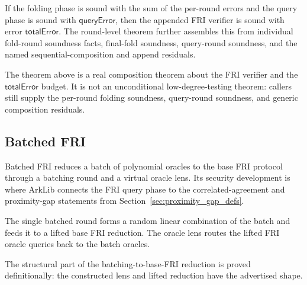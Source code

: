 \begin{theorem}\label{thm:fri_soundness_total_error}
    If the folding phase is sound with the sum of the per-round errors and the query phase is
    sound with $\mathsf{queryError}$, then the appended FRI verifier is sound with error
    $\mathsf{totalError}$.  The round-level theorem further assembles this from individual
    fold-round soundness facts, final-fold soundness, query-round soundness, and the named
    sequential-composition and append residuals.
\end{theorem}

\begin{remark}\label{rem:fri_soundness_status}
    The theorem above is a real composition theorem about the FRI verifier and the
    $\mathsf{totalError}$ budget.  It is not an unconditional low-degree-testing theorem:
    callers still supply the per-round folding soundness, query-round soundness, and generic
    composition residuals.
\end{remark}

\subsection{Batched FRI}\label{sec:batched_fri}

Batched FRI reduces a batch of polynomial oracles to the base FRI protocol through a batching
round and a virtual oracle lens.  Its security development is where ArkLib connects the FRI
query phase to the correlated-agreement and proximity-gap statements from
Section~\ref{sec:proximity_gap_defs}.

\begin{definition}\label{def:batched_fri_reduction}
    The single batched round forms a random linear combination of the batch and feeds it to a
    lifted base FRI reduction.  The oracle lens routes the lifted FRI oracle queries back to the
    batch oracles.
\end{definition}

\begin{definition}\label{def:batched_fri_lens_package}
    The structural part of the batching-to-base-FRI reduction is proved definitionally: the
    constructed lens and lifted reduction have the advertised shape.
\end{definition}

